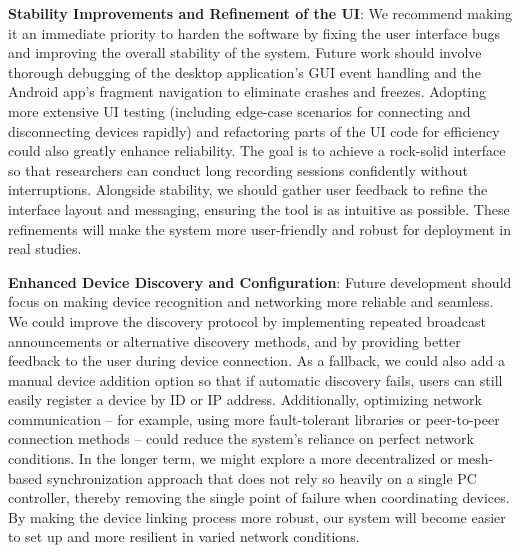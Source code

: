 \textbf{Stability Improvements and Refinement of the UI}: We recommend making it an immediate priority to harden the software by fixing the user interface bugs and improving the overall stability of the system. Future work should involve thorough debugging of the desktop application's GUI event handling and the Android app's fragment navigation to eliminate crashes and freezes. Adopting more extensive UI testing (including edge-case scenarios for connecting and disconnecting devices rapidly) and refactoring parts of the UI code for efficiency could also greatly enhance reliability. The goal is to achieve a rock-solid interface so that researchers can conduct long recording sessions confidently without interruptions. Alongside stability, we should gather user feedback to refine the interface layout and messaging, ensuring the tool is as intuitive as possible. These refinements will make the system more user-friendly and robust for deployment in real studies.

\textbf{Enhanced Device Discovery and Configuration}: Future development should focus on making device recognition and networking more reliable and seamless. We could improve the discovery protocol by implementing repeated broadcast announcements or alternative discovery methods, and by providing better feedback to the user during device connection. As a fallback, we could also add a manual device addition option so that if automatic discovery fails, users can still easily register a device by ID or IP address. Additionally, optimizing network communication -- for example, using more fault-tolerant libraries or peer-to-peer connection methods -- could reduce the system's reliance on perfect network conditions. In the longer term, we might explore a more decentralized or mesh-based synchronization approach that does not rely so heavily on a single PC controller, thereby removing the single point of failure when coordinating devices. By making the device linking process more robust, our system will become easier to set up and more resilient in varied network conditions.

